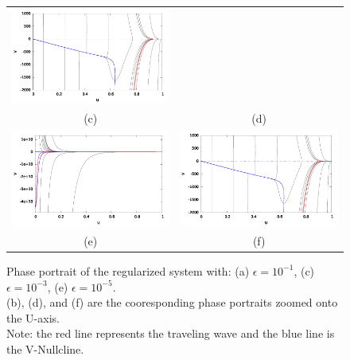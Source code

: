 \documentclass{article}
\begin{document}
\begin{figure}[bht]
\begin{center}
\begin{tabular}{c c}
    \includegraphics[scale = 0.5]{regPhasePlaneZoomed_epsilon10e-3.pdf} \\
    (c) & (d)\\
    \includegraphics[scale = 0.5]{regPhasePlane_epsilon10e-5.pdf} &
    \includegraphics[scale = 0.5]{regPhasePlaneZoomed_epsilon10e-5.pdf} \\
    (e) & (f)   
    \end{tabular}
    
    \caption{Phase portrait of the regularized system with:
    (a) $\epsilon = 10^{-1}$, 
    (c) $\epsilon = 10^{-3}$, 
    (e) $\epsilon = 10^{-5}$. 
    \\(b), (d), and (f) are the cooresponding phase portraits zoomed onto the U-axis.
    \\ Note: the red line represents the traveling wave and the blue line is the V-Nullcline.}
\end{center} \end{figure}
\end{document}
